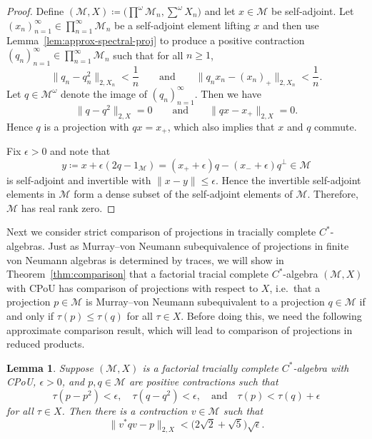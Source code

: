 \documentclass[a4paper,11pt]{amsart}
\newtheorem{lemma}[theorem]{Lemma}
\theoremstyle{definition}
\numberwithin{equation}{section}
\numberwithin{theorem}{section}
\newcommand{\M}{\mathcal{M}}
\begin{document}
\begin{proof}
	Define $(\M, X) \coloneqq \big(\prod^\omega \M_n, \sum^\omega X_n\big)$ and let $x \in \M$ be self-adjoint.  Let $(x_n)_{n=1}^\infty \in \prod_{n=1}^\infty \M_n$ be a self-adjoint element lifting $x$ and then use Lemma~\ref{lem:approx-spectral-proj} to produce a positive contraction $(q_n)_{n=1}^\infty \in \prod_{n=1}^\infty \M_n$ such that for all $n \geq 1$,
	\begin{equation}
		\|q_n - q_n^2\|_{2, X_n} < \frac1n \qquad \text{and} \qquad \|q_n x_n - (x_n)_+\|_{2, X_n} < \frac1n.
	\end{equation}
	Let $q \in \M^\omega$ denote the image of $(q_n)_{n=1}^\infty$.  Then we have
	\begin{equation}
		\|q - q^2\|_{2, X} = 0 \qquad \text{and} \qquad \|qx - x_+ \|_{2, X} = 0.
	\end{equation}
	Hence $q$ is a projection with $q x = x_+$, which also implies that $x$ and $q$ commute.
	
	Fix $\epsilon > 0$ and note that 
	\begin{equation}
		y \coloneqq x +\epsilon(2q - 1_\M) = (x_+ + \epsilon)q - (x_- + \epsilon)q^\perp \in \M
	\end{equation}
	is self-adjoint and invertible with $\|x - y\| \leq \epsilon$. Hence the invertible self-adjoint elements in $\M$ form a dense subset of the self-adjoint elements of $\M$.  Therefore, $\M$ has real rank zero.
\end{proof}

Next we consider strict comparison of projections in tracially complete $C^*$-algebras.  Just as Murray--von Neumann subequivalence of projections in finite von Neumann algebras is determined by traces,  we will show in Theorem~\ref{thm:comparison} that a factorial tracial complete $C^*$-algebra $(\M, X)$ with CPoU has comparison of projections with respect to $X$, i.e.\ that a projection $p\in\M$ is Murray--von Neumann subequivalent to a projection $q\in\M$ if and only if $\tau(p) \leq \tau(q)$ for all $\tau \in X$. Before doing this, we need the following approximate comparison result, which will lead to comparison of projections in reduced products.

\begin{lemma}\label{lem:approximate-comparison}
	Suppose $(\M, X)$ is a factorial tracially complete $C^*$-algebra with CPoU, $\epsilon > 0$, and $p, q \in \M$ are positive contractions such that
	\begin{equation}\label{eq:almost-projection}
		\tau(p - p^2) < \epsilon, \quad \tau(q - q^2) < \epsilon, \quad \text{and} \quad \tau(p) < \tau(q) + \epsilon
	\end{equation}
	for all $\tau \in X$.  Then there is a contraction $v \in \M$ such that
	\begin{equation}\label{eq:approx-subequivalence}
		\| v^*q v - p \|_{2, X} < \big(2 \sqrt{2} + \sqrt{5}\big)\sqrt{\epsilon}.
	\end{equation}
\end{lemma}
\end{document}
